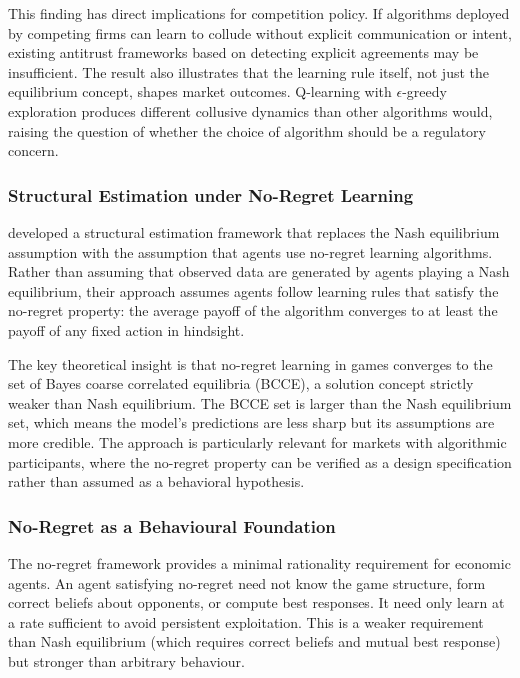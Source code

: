 This finding has direct implications for competition policy. If algorithms deployed by competing firms can learn to collude without explicit communication or intent, existing antitrust frameworks based on detecting explicit agreements may be insufficient. The result also illustrates that the learning rule itself, not just the equilibrium concept, shapes market outcomes. Q-learning with $\epsilon$-greedy exploration produces different collusive dynamics than other algorithms would, raising the question of whether the choice of algorithm should be a regulatory concern.

\subsubsection{Structural Estimation under No-Regret Learning}

\citet{LomysMagnolfi2024} developed a structural estimation framework that replaces the Nash equilibrium assumption with the assumption that agents use no-regret learning algorithms. Rather than assuming that observed data are generated by agents playing a Nash equilibrium, their approach assumes agents follow learning rules that satisfy the no-regret property: the average payoff of the algorithm converges to at least the payoff of any fixed action in hindsight.

The key theoretical insight is that no-regret learning in games converges to the set of Bayes coarse correlated equilibria (BCCE), a solution concept strictly weaker than Nash equilibrium. The BCCE set is larger than the Nash equilibrium set, which means the model's predictions are less sharp but its assumptions are more credible. The approach is particularly relevant for markets with algorithmic participants, where the no-regret property can be verified as a design specification rather than assumed as a behavioral hypothesis.

\subsubsection{No-Regret as a Behavioural Foundation}

The no-regret framework provides a minimal rationality requirement for economic agents. An agent satisfying no-regret need not know the game structure, form correct beliefs about opponents, or compute best responses. It need only learn at a rate sufficient to avoid persistent exploitation. This is a weaker requirement than Nash equilibrium (which requires correct beliefs and mutual best response) but stronger than arbitrary behaviour.


